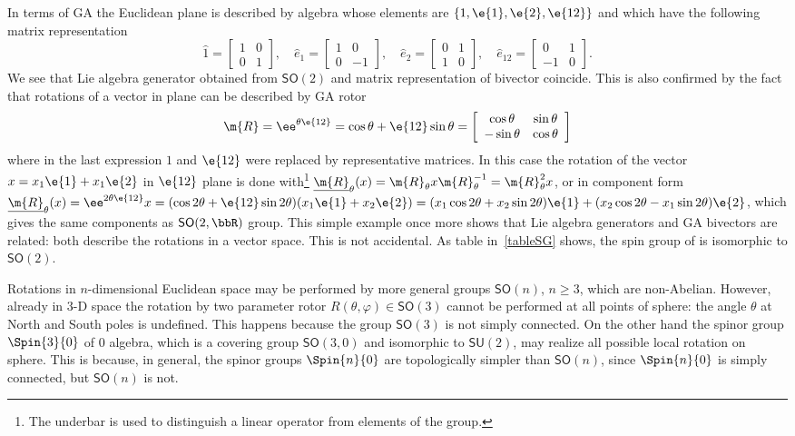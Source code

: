 \begin{example}
In terms of GA the Euclidean plane is described by 
algebra whose elements are $\{1,\e{1},\e{2},\e{12}\}$ and  which
have the following matrix representation
\begin{equation*}
\hat{1}=\left[
\begin{array}{cc}
1&0\\0&1
\end{array}
\right], \quad \hat{e}_1=\left[
\begin{array}{cc}
1&0\\0&-1
\end{array}
\right],\quad \hat{e}_2=\left[
\begin{array}{cc}
0&1\\1&0
\end{array}
\right],\quad  \hat{e}_{12}=\left[
\begin{array}{cc}
0&1\\-1&0
\end{array}
\right].
\end{equation*}
We see that Lie algebra generator obtained from  $\mathsf{SO}(2)$
and matrix representation of  bivector   coincide. This
is also confirmed by the fact that rotations of a vector in plane
can be described by GA rotor
\[\m{R}=\ee^{\theta\e{12}}=\cos\theta+\e{12}\sin\theta=
\left[\begin{array}{cc}
 \cos\theta &\sin\theta\\
-\sin\theta &\cos\theta
\end{array}\right]\]
where in the last expression $1$ and $\e{12}$ were replaced by
representative  matrices. In this case the rotation of the vector
$x=x_1\e{1}+x_1\e{2}$ in $\e{12}$ plane  is done with\footnote{The
underbar is used to distinguish a linear operator from elements of
the group.} $\underline{\m{R}}_{\theta}(x)=
\m{R}_{\theta}x\m{R}^{-1}_{\theta}=\m{R}_{\theta}^2 x$, or in
component form
$\underline{\m{R}}_{\theta}(x)=\ee^{2\theta\e{12}}x=(\cos
2\theta+\e{12}\sin 2\theta)(x_1\e{1}+x_2\e{2})=(x_1\cos
2\theta+x_2\sin 2\theta)\e{1}+( x_2\cos 2\theta-x_1\sin
2\theta)\e{2}$, which gives the same components as
$\mathsf{SO}(2,\bbR)$ group. This simple example once more shows that
Lie algebra generators and GA bivectors are related: both describe
the rotations in a vector space. This is not accidental. As table
in~\ref{tableSG} shows, the spin group of  is isomorphic
to $\mathsf{SO}(2)$.


Rotations in $n$-dimensional Euclidean  space may be performed by
more general groups $\mathsf{SO}(n)$, $n\ge 3$, which are
non-Abelian. However, already in $3$-D space the  rotation by two
parameter rotor $R(\theta,\varphi)\in\mathsf{SO}(3)$  cannot be
performed at all points of sphere:  the angle $\theta$ at North
and South poles is undefined. This happens because the group
$\mathsf{SO}(3)$ is not simply connected. On the other hand the
spinor group $\Spin{3}{0}$ of 0{} algebra, which is a
covering group $\mathsf{SO}(3,0)$ and isomorphic to $\mathsf{SU}(2)$,
may realize all possible local rotation on sphere. This is
because, in general, the spinor groups $\Spin{n}{0}$ are
topologically simpler than $\mathsf{SO}(n)$, since $\Spin{n}{0}$
is simply connected, but $\mathsf{SO}(n)$ is not.
\end{example}
